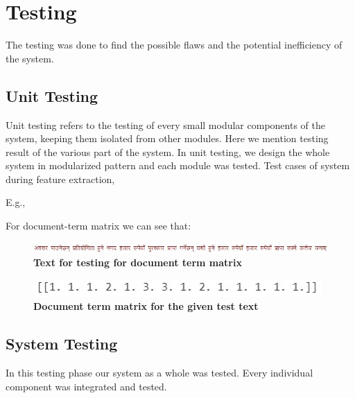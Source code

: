 \documentclass[12pt]{report}
\begin{document}
        \section{Testing}
        The testing was done to find the possible flaws and the potential inefficiency of the system.

        \subsection{Unit Testing}
        Unit testing refers to the testing of every small modular components of the system, keeping them isolated from other modules.
        Here we mention testing result of the various part of the system. In unit testing, we design the whole system in modularized pattern and 
        each module was tested. 
        Test cases of system during feature extraction,

        E.g.,

            For document-term matrix we can see that: 
            \begin{figure}[h]
                \centering
                \includegraphics[scale=0.7]{testText.jpg}
                \caption{\textbf{Text for testing for document term matrix}}
            \end{figure}
            \begin{figure}[h]
                \centering
                \includegraphics{docTerm.jpg}
                \caption{\textbf{ Document term matrix for the given test text}}
            \end{figure}


        \subsection{System Testing}
        In this testing phase our system as a whole was tested. Every individual component was integrated and tested.
\end{document}
